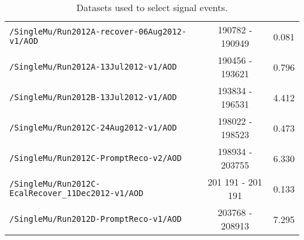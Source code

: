 \begin{table}[hbt]
\begin{center}
\begin{tabular}{lcc}
\verb=/SingleMu/Run2012A-recover-06Aug2012-v1/AOD=                    &   190782 - 190949          & 0.081          \\ 
\verb=/SingleMu/Run2012A-13Jul2012-v1/AOD=                                     &  190456 - 193621      & 0.796                \\ 
\verb=/SingleMu/Run2012B-13Jul2012-v1/AOD=                                     &  193834 - 196531  & 4.412 \\ 
\verb=/SingleMu/Run2012C-24Aug2012-v1/AOD=                                   &   198022 - 198523     & 0.473               \\ 
\verb=/SingleMu/Run2012C-PromptReco-v2/AOD=                                  &   198934 - 203755    & 6.330                \\ 
\verb=/SingleMu/Run2012C-EcalRecover_11Dec2012-v1/AOD=          & 201 191 - 201 191 & 0.133 \\
\verb=/SingleMu/Run2012D-PromptReco-v1/AOD=                                  &  203768 - 208913   &  7.295 \\



 \hline\hline
\end{tabular}
\caption{\label{tab:DilDsets}Datasets used to select signal events.}
\end{center}
\end{table}

